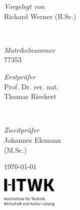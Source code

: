 \begin{titlepage}
		\vfill
		
		
		\begin{minipage}{0.4\textwidth}
			\begin{flushleft}
				\large
				\textit{Vorgelegt von}\\
				\textsc{}Richard Werner (B.Sc.)
			\end{flushleft}
		\end{minipage}
		~
		\begin{minipage}{0.4\textwidth}
			\begin{flushright}
				\large
				\textit{Matrikelnummer}\\
				\textsc{}77353
			\end{flushright}
		\end{minipage}
		
		
		\vfill
		
		\begin{minipage}{0.4\textwidth}
			\begin{flushleft}
				\large
				\textit{Erstprüfer}\\
				\textsc{}Prof. Dr. rer. nat.\\Thomas Riechert%
			\end{flushleft}
		\end{minipage}
		~
		\begin{minipage}{0.4\textwidth}
			\begin{flushright}
				\large
				\textit{Zweitprüfer}\\
				\textsc{}Johannes Elsmann\\(M.Sc.)%
			\end{flushright}
		\end{minipage}
		
		\vfill
		\vfill
		
		{\large\today} %
		
		
		\vfill\vfill
		\includegraphics[width=0.2\textwidth]{misc/HTWK_Zusatz_de_V_Black.jpg}\\[1cm] 
		
		
		\vfill %
		
	\end{titlepage}